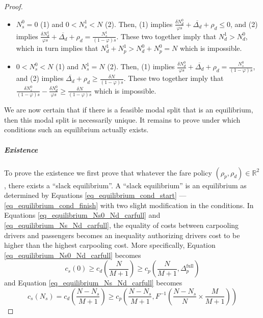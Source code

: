 \documentclass[english, a4paper]{article}
\theoremstyle{plain}
\theoremstyle{definition}
\theoremstyle{remark}
\begin{document}
\begin{proof}
\begin{itemize}
        \item $N_s^0 = 0$ (1) and $0 < N_s^1 < N$ (2). Then, (1) implies $\frac{\delta N_d^0}{\varphi s} + \overline{\Delta _d} + \rho _d \leq 0$, and (2) implies $\frac{\delta N_d^1}{\varphi s} + \overline{\Delta _d} + \rho _d = \frac{N_s^1}{(1-\varphi)s}$. These two together imply that $N_d^1 > N_d^0$, which in turn implies that $N_d^1 + N_p^1 > N_d^0 + N_p^0 = N$ which is impossible.
        \item $0 < N_s^0 < N$ (1) and $N_s^1 = N$ (2). Then, (1) implies $\frac{\delta N_d^0}{\varphi s} + \overline{\Delta _d} + \rho _d = \frac{N_s^0}{(1-\varphi)s}$, and (2) implies $\overline{\Delta _d} + \rho _d \geq \frac{\delta N}{(1-\varphi)s}$. These two together imply that $\frac{\delta N_s^0}{(1-\varphi)s} - \frac{\delta N_d^0}{\varphi s} \geq \frac{\delta N}{(1-\varphi)s}$ which is impossible.
    \end{itemize}

    We are now certain that if there is a feasible modal split that is an equilibrium, then this modal split is necessarily unique. It remains to prove under which conditions such an equilibrium actually exists.

    \item \subparagraph{Existence}

    To prove the existence we first prove that whatever the fare policy $(\rho_p, \rho_d) \in \mathbb{R}^2$, there exists a ``slack equilibrium''. A ``slack equilibrium'' is an equilibrium as determined by Equations \ref{eq_equilibrium_cond_start} --- \ref{eq_equilibrium_cond_finish} with two slight modification in the conditions. In Equations \ref{eq_equilibrium_Ns0_Nd_carfull} and \ref{eq_equilibrium_Ns_Nd_carfull}, the equality of costs between carpooling drivers and passengers becomes an inequality authorizing drivers cost to be higher than the highest carpooling cost. More specifically, Equation \ref{eq_equilibrium_Ns0_Nd_carfull} becomes
    \begin{equation}
    \label{eq_equilibrium_Ns0_Nd_carfull_slack}
        c_s(0) \geq c_d \left(\frac{N}{M+1}\right) \geq c_p\left(\frac{N}{M+1}, \Delta _p^{\text{full}}\right)
    \end{equation}
    and Equation \ref{eq_equilibrium_Ns_Nd_carfull} becomes
    \begin{equation}
    \label{eq_equilibrium_Ns_Nd_carfull_slack}
        c_s(N_s) =  c_d \left( \frac{N-N_s}{M+1} \right) \geq c_p \left( \frac{N-N_s}{M+1}, F^{-1} \left( \frac{N-N_s}{N}\times \frac{M}{M+1} \right) \right)
    \end{equation}
    

\end{proof}
\end{document}
